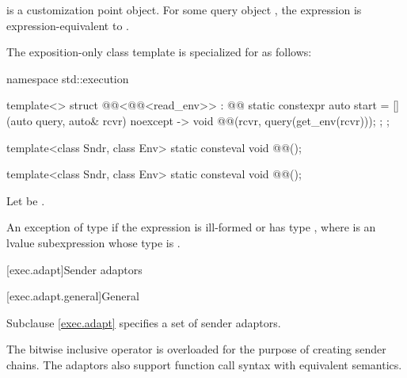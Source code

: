 \pnum
{} is a customization point object.
For some query object ,
the expression  is expression-equivalent to
.

\pnum
The exposition-only class template 
is specialized for  as follows:
\begin{codeblock}
namespace std::execution {
  template<>
  struct @@<@@<read_env>> : @@ {
    static constexpr auto start =
      [](auto query, auto& rcvr) noexcept -> void {
        @@(rcvr, query(get_env(rcvr)));
      };
  };

  template<class Sndr, class Env>
    static consteval void @@();
}
\end{codeblock}

\begin{itemdecl}
template<class Sndr, class Env>
  static consteval void @@();
\end{itemdecl}

\begin{itemdescr}
\pnum
Let  be .

\pnum
\throws
An exception of type
 if
the expression  is ill-formed or has type , where
 is an lvalue subexpression whose type is .
\end{itemdescr}

[exec.adapt]{Sender adaptors}

[exec.adapt.general]{General}

\pnum
Subclause \ref{exec.adapt} specifies a set of sender adaptors.

\pnum
The bitwise inclusive  operator is overloaded
for the purpose of creating sender chains.
The adaptors also support function call syntax with equivalent semantics.

